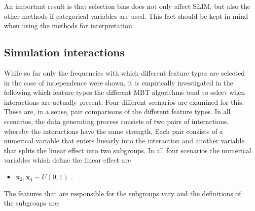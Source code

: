 An important result is that selection bias does not only affect SLIM, but also the other methods if categorical variables are used. This fact should be kept in mind when using the methods for interpretation.





\subsection{Simulation interactions}
While so far only the frequencies with which different feature types are selected in the case of independence were shown, it is empirically investigated in the following which feature types the different MBT algorithms tend to select when interactions are actually present.
Four different scenarios are examined for this. These are, in a sense, pair comparisons of the different feature types. In all scenarios, the data generating process consists of two pairs of interactions, whereby the interactions have the same strength. Each pair consists of a numerical variable that enters linearly into the interaction and another variable that splits the linear effect into two subgroups.
In all four scenarios the numerical variables which define the linear effect are 
\begin{itemize}
    \item $\textbf{x}_{2}, \textbf{x}_{4} \sim U(0,1)$ .
\end{itemize}
The features that are responsible for the subgroups vary and the definitions of the subgroups are:


